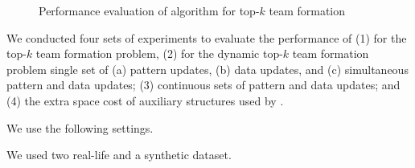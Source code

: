 \begin{figure}[tb!]
\begin{center}
\hspace{0.2ex}
\vspace{-2.0ex}
\end{center}

\vspace{-3ex}
\caption{Performance evaluation of algorithm \optgrouprec for top-$k$ team formation}
\label{exp-semantic-effectiveness-citation}
\vspace{-3.0ex}
\end{figure}

We conducted four sets of experiments to evaluate the performance of
(1) \optgrouprec for the top-$k$ team formation problem,
(2) \inc for the dynamic top-$k$ team formation problem
\wrt single set of (a) pattern updates, (b) data updates, and (c) simultaneous pattern and data updates;
(3) \inc \wrt continuous sets of pattern and data updates; and
(4) the extra space cost of auxiliary structures used by \inc.

\vspace{-0.2ex}
 We use the following settings.

\vspace{-0.3ex}
 We used two real-life and a synthetic dataset.

